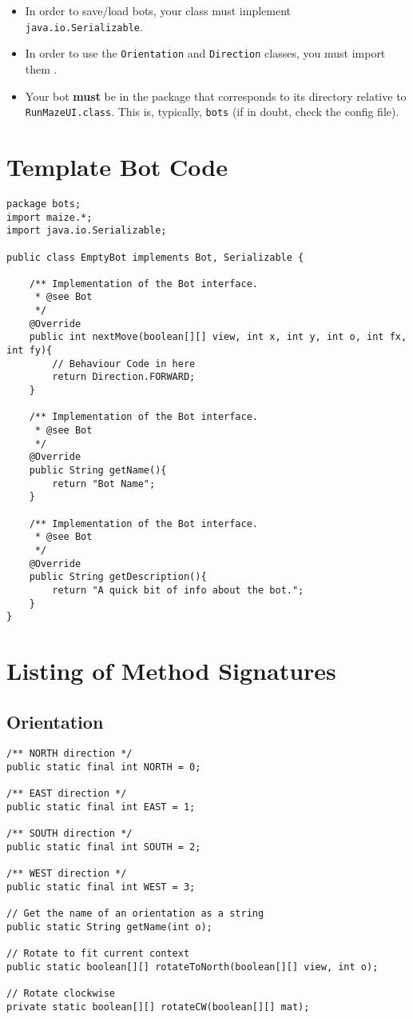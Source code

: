 \documentclass[11pt]{article}
\begin{document}
\begin{itemize}
\item In order to save/load bots, your class must implement \texttt{java.io.Serializable}.  
\item In order to use the \texttt{Orientation} and \texttt{Direction} classes, you must import them .
\item Your bot \textbf{must} be in the package that corresponds to its directory relative to \texttt{RunMazeUI.class}.  This is, typically, \texttt{bots} (if in doubt, check the config file).
\end{itemize}

\pagebreak
\section{Template Bot Code}
\label{section:template}
\begin{lstlisting}
package bots;
import maize.*;
import java.io.Serializable;

public class EmptyBot implements Bot, Serializable {

    /** Implementation of the Bot interface.
     * @see Bot
     */
    @Override
    public int nextMove(boolean[][] view, int x, int y, int o, int fx, int fy){
        // Behaviour Code in here
        return Direction.FORWARD;
    }

    /** Implementation of the Bot interface.
     * @see Bot
     */
    @Override
    public String getName(){
        return "Bot Name";
    }

    /** Implementation of the Bot interface.
     * @see Bot
     */
    @Override
    public String getDescription(){
        return "A quick bit of info about the bot.";
    }
}
\end{lstlisting}


\pagebreak
\appendix
\section{Listing of Method Signatures}
\subsection{Orientation}
\begin{lstlisting}
/** NORTH direction */
public static final int NORTH = 0;

/** EAST direction */
public static final int EAST = 1;

/** SOUTH direction */
public static final int SOUTH = 2;

/** WEST direction */
public static final int WEST = 3;

// Get the name of an orientation as a string
public static String getName(int o);

// Rotate to fit current context
public static boolean[][] rotateToNorth(boolean[][] view, int o);

// Rotate clockwise
private static boolean[][] rotateCW(boolean[][] mat);
\end{lstlisting}
\end{document}
